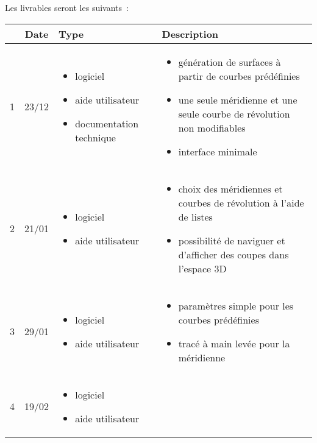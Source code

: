\documentclass{scrartcl}
\begin{document}
		Les livrables seront les suivants~:\\
		\begin{tabular}{|c|c|p{4cm}|p{7.5cm}|} %
			\hline
			\textbf{\No} & \textbf{Date} & \textbf{Type}&\textbf{Description} \\
			\hline
			1 & 23/12 & 
			\begin{itemize}
				\item logiciel
				\item aide utilisateur
				\item documentation technique
			\end{itemize}& 
			\begin{itemize}
				\item génération de surfaces à partir de courbes prédéfinies
				\item une seule méridienne et une seule courbe de révolution non modifiables
				\item interface minimale
			\end{itemize} \\
			\hline
			2 & 21/01& 
			\begin{itemize}
				\item logiciel
				\item aide utilisateur
			\end{itemize}& 
			\begin{itemize}
				\item choix des méridiennes et courbes de révolution à l'aide de listes
				\item possibilité de naviguer et d'afficher des coupes dans l'espace 3D
			\end{itemize} \\
			\hline
			3 & 29/01 &
			\begin{itemize}
				\item logiciel
				\item aide utilisateur
			\end{itemize}& 
			\begin{itemize}
				\item paramètres simple pour les courbes prédéfinies
				\item tracé à main levée pour la méridienne
			\end{itemize} \\
			\hline
			4 & 19/02 &
			\begin{itemize}
				\item logiciel
				\item aide utilisateur

\end{itemize}
\end{tabular}
\end{document}
